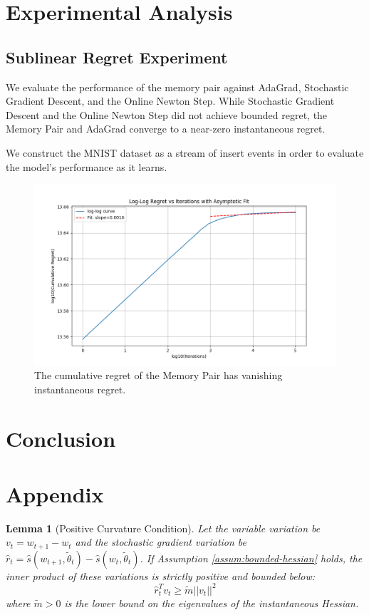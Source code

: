 \documentclass[a4paper,12pt]{article}
\newtheorem{lemma}[theorem]{Lemma}
\begin{document}
\section{Experimental Analysis}

\subsection{Sublinear Regret Experiment}

We evaluate the performance of the memory pair against AdaGrad, Stochastic Gradient Descent, and the Online Newton Step. While Stochastic Gradient Descent and the Online Newton Step did not achieve bounded regret, the Memory Pair and AdaGrad converge to a near-zero instantaneous regret.

We construct the MNIST dataset as a stream of insert events in order to evaluate the model's performance as it learns.  

\begin{figure}
    \centering
    \includegraphics[width=1\linewidth]{rotmnist_drift_memorypair_loglog_fit.png}
    \caption{The cumulative regret of the Memory Pair has vanishing instantaneous regret.}
    \label{fig:enter-label}
\end{figure}

\section{Conclusion}


\section{Appendix}

\begin{lemma}[Positive Curvature Condition]
\label{lem:positive-curvature}
Let the variable variation be $v_t = w_{t+1} - w_t$ and the stochastic gradient variation be $\hat{r}_t = \hat{s}(w_{t+1}, \tilde{\theta}_t) - \hat{s}(w_t, \tilde{\theta}_t)$. If Assumption \ref{assum:bounded-hessian} holds, the inner product of these variations is strictly positive and bounded below:
$$
\hat{r}_t^{T} v_t \ge \tilde{m} ||v_t||^2
$$
where $\tilde{m} > 0$ is the lower bound on the eigenvalues of the instantaneous Hessian.
\end{lemma}
\end{document}
